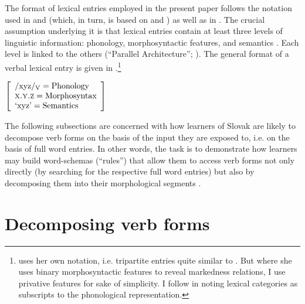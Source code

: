 \documentclass[output=paper,colorlinks,citecolor=brown,
]{langscibook}
\begin{document}
The format of lexical entries employed in the present paper follows the notation used in \citet{Haspelmath2002} and \citet{HaspelmathSims2010} (which, in turn, is based on \citealt{Becker1990,Becker1993a,Becker1993b} and \citealt{Bochner1993}) as well as in \citet{Jackendoff.Audring2016,Jackendoff.Audring2018}. The crucial assumption underlying it is that lexical entries contain at least three levels of linguistic information: phonology, morphosyntactic features, and semantics \citep[similar assumptions are made by Manfred Bierwisch, e.g.][]{Bierwisch1983,Bierwisch1997,Bierwisch2007}. Each level is linked to the others (``Parallel Architecture''; \citealt{Jackendoff2002,Jackendoff2007,Jackendoff2010,Culicover.Jackendoff2005}). The general format of a verbal lexical entry is given in .\footnote{\citet{Zimmermann2019} uses her own notation, i.e. tripartite entries quite similar to . But where she uses binary morphosyntactic features to reveal markedness relations, I use privative features for sake of simplicity. I follow \citet{HaspelmathSims2010} in noting lexical categories as subscripts to the phonological representation.}

\ea\label{ex:GeneralFormat}
$\left[
\begin{array}{l}
    \text{/xyz/\textsubscript{V}} = \text{Phonology} \\
    \textsc{x.y.z} = \text{Morphosyntax} \\
    \text{`xyz'} = \text{Semantics}
\end{array}
\right] $  \hfill \citep[cf.][48--49]{Haspelmath2002}
\z

\noindent The following subsections are concerned with how learners of Slovak are likely to decompose verb forms on the basis of the input they are exposed to, i.e. on the basis of full word entries. In other words, the task is to demonstrate how learners may build word-schemas (``rules'') that allow them to access verb forms not only directly (by searching for the respective full word entries) but also by decomposing them into their morphological segments \citep[see][72--74]{HaspelmathSims2010}.


\section{Decomposing verb forms}\label{sec:Decomposing}
\end{document}

